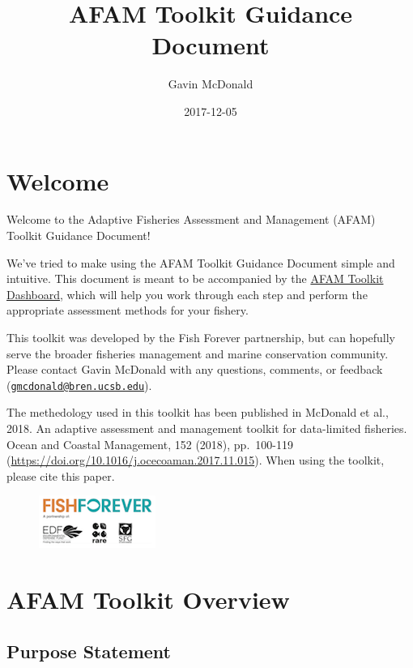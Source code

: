 \documentclass[]{book}
\title{AFAM Toolkit Guidance Document}
\author{Gavin McDonald}
\date{2017-12-05}
\begin{document}
\maketitle

{
\setcounter{tocdepth}{1}
\tableofcontents
}
\chapter*{Welcome}\label{welcome}

Welcome to the Adaptive Fisheries Assessment and Management (AFAM)
Toolkit Guidance Document!

We've tried to make using the AFAM Toolkit Guidance Document simple and
intuitive. This document is meant to be accompanied by the
\href{https://github.com/SFG-UCSB/afamAppPackage}{AFAM Toolkit
Dashboard}, which will help you work through each step and perform the
appropriate assessment methods for your fishery.

This toolkit was developed by the Fish Forever partnership, but can
hopefully serve the broader fisheries management and marine conservation
community. Please contact Gavin McDonald with any questions, comments,
or feedback
(\href{mailto:gmcdonald@bren.ucsb.edu}{\nolinkurl{gmcdonald@bren.ucsb.edu}}).

The methedology used in this toolkit has been published in McDonald et
al., 2018. An adaptive assessment and management toolkit for
data-limited fisheries. Ocean and Coastal Management, 152 (2018),
pp.~100-119 (\url{https://doi.org/10.1016/j.ocecoaman.2017.11.015}).
When using the toolkit, please cite this paper.

\begin{figure}
\centering
\includegraphics{myMediaFolder/media/FF_Logo.png}
\caption{}
\end{figure}

\chapter*{AFAM Toolkit Overview}\label{afam-toolkit-overview}

\section{Purpose Statement}\label{purpose-statement}
\end{document}
